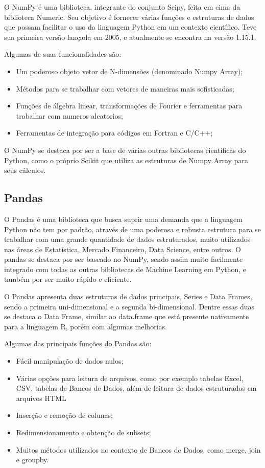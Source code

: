 O NumPy é uma biblioteca, integrante do conjunto Scipy, feita em cima da biblioteca Numeric. Seu objetivo é fornecer várias funções e estruturas de dados que possam facilitar o uso da linguagem Python em um contexto científico. Teve sua primeira versão lançada em 2005, e atualmente se encontra na versão 1.15.1. \cite{numpy}

Algumas de suas funcionalidades são:

\begin{itemize}
  \item  Um poderoso objeto vetor de N-dimensões (denominado Numpy Array);
  \item Métodos para se trabalhar com vetores de maneiras mais sofisticadas;
  \item Funções de álgebra linear, transformações de Fourier e ferramentas para trabalhar com numeros aleatorios;
  \item Ferramentas de integração para códigos em Fortran e C/C++;
\end{itemize}

O NumPy se destaca por ser a base de várias outras bibliotecas científicas do Python, como o próprio Scikit que utiliza as estruturas de Numpy Array para seus cálculos.  

\subsection{Pandas}
\label{ss.pandas}

O Pandas é uma biblioteca que busca suprir uma demanda que a linguagem Python não tem por padrão, através de uma poderosa e robusta estrutura para se trabalhar com uma grande quantidade de dados estruturados, muito utilizados nas áreas de Estatística, Mercado Financeiro, Data Science, entre outros. \cite{pandas-article} O pandas se destaca por ser baseado no NumPy, sendo assim muito facilmente integrado com todas as outras bibliotecas de Machine Learning em Python, e também por ser muito rápido e eficiente.

O Pandas apresenta duas estruturas de dados principais, Series e Data Frames, sendo a primeira uni-dimensional e a segunda bi-dimensional. Dentre essas duas se destaca o Data Frame, similar ao data.frame que está presente nativamente para a linguagem R, porém com algumas melhorias. 

Algumas das principais funções do Pandas são:

\begin{itemize}
    \item Fácil manipulação de dados nulos;
    \item Várias opções para leitura de arquivos, como por exemplo tabelas Excel, CSV, tabelas de Bancos de Dados, além de leitura de dados estruturados em arquivos HTML
    \item Inserção e remoção de colunas;
    \item Redimensionamento e obtenção de subsets;
    \item Muitos métodos utilizados no contexto de Bancos de Dados, como merge, join e groupby.
\end{itemize}

